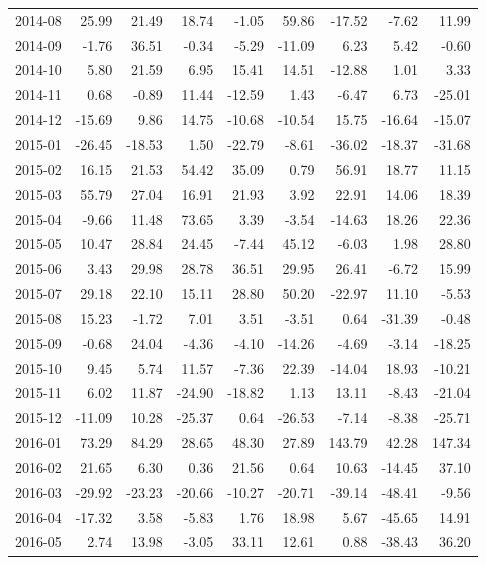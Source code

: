 \begin{table}[ht]
\begin{tabular}{lrrrrrrrr}
  2014-08 & 25.99 & 21.49 & 18.74 & -1.05 & 59.86 & -17.52 & -7.62 & 11.99 \\ 
  2014-09 & -1.76 & 36.51 & -0.34 & -5.29 & -11.09 & 6.23 & 5.42 & -0.60 \\ 
  2014-10 & 5.80 & 21.59 & 6.95 & 15.41 & 14.51 & -12.88 & 1.01 & 3.33 \\ 
  2014-11 & 0.68 & -0.89 & 11.44 & -12.59 & 1.43 & -6.47 & 6.73 & -25.01 \\ 
  2014-12 & -15.69 & 9.86 & 14.75 & -10.68 & -10.54 & 15.75 & -16.64 & -15.07 \\ 
  2015-01 & -26.45 & -18.53 & 1.50 & -22.79 & -8.61 & -36.02 & -18.37 & -31.68 \\ 
  2015-02 & 16.15 & 21.53 & 54.42 & 35.09 & 0.79 & 56.91 & 18.77 & 11.15 \\ 
  2015-03 & 55.79 & 27.04 & 16.91 & 21.93 & 3.92 & 22.91 & 14.06 & 18.39 \\ 
  2015-04 & -9.66 & 11.48 & 73.65 & 3.39 & -3.54 & -14.63 & 18.26 & 22.36 \\ 
  2015-05 & 10.47 & 28.84 & 24.45 & -7.44 & 45.12 & -6.03 & 1.98 & 28.80 \\ 
  2015-06 & 3.43 & 29.98 & 28.78 & 36.51 & 29.95 & 26.41 & -6.72 & 15.99 \\ 
  2015-07 & 29.18 & 22.10 & 15.11 & 28.80 & 50.20 & -22.97 & 11.10 & -5.53 \\ 
  2015-08 & 15.23 & -1.72 & 7.01 & 3.51 & -3.51 & 0.64 & -31.39 & -0.48 \\ 
  2015-09 & -0.68 & 24.04 & -4.36 & -4.10 & -14.26 & -4.69 & -3.14 & -18.25 \\ 
  2015-10 & 9.45 & 5.74 & 11.57 & -7.36 & 22.39 & -14.04 & 18.93 & -10.21 \\ 
  2015-11 & 6.02 & 11.87 & -24.90 & -18.82 & 1.13 & 13.11 & -8.43 & -21.04 \\ 
  2015-12 & -11.09 & 10.28 & -25.37 & 0.64 & -26.53 & -7.14 & -8.38 & -25.71 \\ 
  2016-01 & 73.29 & 84.29 & 28.65 & 48.30 & 27.89 & 143.79 & 42.28 & 147.34 \\ 
  2016-02 & 21.65 & 6.30 & 0.36 & 21.56 & 0.64 & 10.63 & -14.45 & 37.10 \\ 
  2016-03 & -29.92 & -23.23 & -20.66 & -10.27 & -20.71 & -39.14 & -48.41 & -9.56 \\ 
  2016-04 & -17.32 & 3.58 & -5.83 & 1.76 & 18.98 & 5.67 & -45.65 & 14.91 \\ 
  2016-05 & 2.74 & 13.98 & -3.05 & 33.11 & 12.61 & 0.88 & -38.43 & 36.20 \\ 

\end{tabular}
\end{table}
